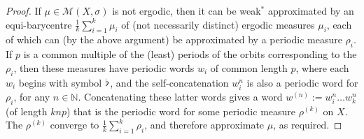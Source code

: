 \documentclass[reqno,11pt]{amsart}
\theoremstyle{definition}
\theoremstyle{remark}
\theoremstyle{remark}
\def \N {\mathbb N}
\def\m{\mathcal M}
\def\b{\kern 0.02em \flat \kern 0.02em}
\numberwithin{equation}{section}
\begin{document}
\begin{proof}
If $\mu\in\m(X,\sigma)$ is not ergodic, then it can be weak$^*$ approximated by an equi-barycentre $\frac{1}{k}\sum_{i=1}^k \mu_i$ of (not necessarily distinct) ergodic measures $\mu_i$, each of which can (by the above argument) be approximated by a periodic measure $\rho_i$. If $p$ is a common multiple of the (least) periods of the orbits corresponding to the $\rho_i$,
then these measures have periodic words $w_i$ of common length $p$, 
where each $w_i$ begins with symbol $\b$,
and the self-concatenation $w_i^n$ is also a periodic word for $\rho_i$, for any $n\in\N$.
Concatenating these latter words gives a word $w^{(n)}:=w_i^n\ldots w_k^n$ (of length $knp$) that is the periodic word for some periodic measure $\rho^{(k)}$ on $X$. The $\rho^{(k)}$ converge to $\frac{1}{k}\sum_{i=1}^k \rho_i$,
and therefore approximate $\mu$, as required.
\end{proof}
\end{document}

